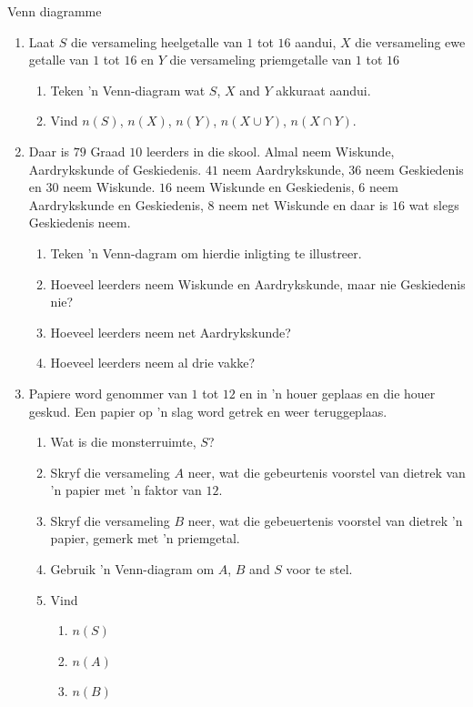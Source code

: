 \begin{exercises}{Venn diagramme}
{
  \begin{enumerate}[itemsep=5pt, label=\textbf{\arabic*}.]
  \item  Laat $S$ die versameling heelgetalle van $1$ tot $16$ aandui, $X$
    die versameling ewe getalle van $1$ tot $16$ en $Y$ die versameling priemgetalle van $1$ tot $16$
    \begin{enumerate}[noitemsep, label=\textbf{(\alph*)} ]
    \item Teken 'n Venn-diagram wat $S$, $X$ and $Y$ akkuraat aandui.
    \item Vind $n\left(S\right)$, $n\left(X\right)$, $n\left(Y\right)$,
      $n\left(X\cup Y\right)$, $n\left(X\cap Y\right)$.
    \end{enumerate}
  \item Daar is $79$ Graad $10$ leerders in die skool. Almal neem Wiskunde, Aardrykskunde of Geskiedenis. $41$ neem Aardrykskunde, $36$ neem Geskiedenis en $30$ neem Wiskunde. $16$ neem Wiskunde en Geskiedenis, $6$ neem Aardrykskunde en Geskiedenis, $8$ neem net Wiskunde en daar is $16$ wat slegs Geskiedenis neem.
    \begin{enumerate}[noitemsep, label=\textbf{(\alph*)} ]
    \item Teken 'n Venn-dagram om hierdie inligting te illustreer.
    \item Hoeveel leerders neem Wiskunde en Aardrykskunde, maar nie Geskiedenis nie?
    \item Hoeveel leerders neem net Aardrykskunde?
    \item Hoeveel leerders neem al drie vakke?
    \end{enumerate}
  \item Papiere word genommer van $1$ tot $12$ en in 'n houer geplaas en die houer geskud. Een papier op 'n slag word getrek en weer teruggeplaas.
    \begin{enumerate}[noitemsep, label=\textbf{(\alph*)} ]
    \item Wat is die monsterruimte, $S$?
    \item Skryf die versameling $A$ neer, wat die gebeurtenis voorstel van dietrek van 'n papier met 'n faktor van $12$.
    \item Skryf die versameling $B$ neer, wat die gebeuertenis voorstel van dietrek 'n papier, gemerk met 'n priemgetal.
    \item Gebruik 'n Venn-diagram om $A$, $B$ and $S$ voor te stel.
    \item Vind
      \begin{enumerate}[noitemsep, label=\textbf{\roman*.} ]
      \item $n\left(S\right)$
      \item $n\left(A\right)$
      \item $n\left(B\right)$

      \end{enumerate}

    \end{enumerate}
 \end{enumerate}

}
\end{exercises}

